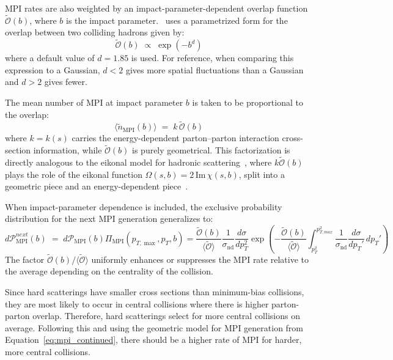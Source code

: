 MPI rates are also weighted by an impact-parameter-dependent overlap function $\tilde{\mathcal{O}}(b)$, where $b$ is the impact parameter. 
\pythia\ uses a parametrized form for the overlap between two colliding hadrons given by:
\begin{equation}
\tilde{\mathcal{O}}(b) \;\propto\; \exp\!\left(-b^d\right)
\end{equation}
where a default value of $d = 1.85$ is used. 
For reference, when comparing this expression to a Gaussian, $d < 2$ gives more spatial fluctuations than a Gaussian and $d > 2$ gives fewer. 

The mean number of MPI at impact parameter $b$ is taken to be proportional to the overlap:
\begin{equation}
\langle \tilde{n}_{\text{MPI}}(b) \rangle \;=\; k\,\tilde{\mathcal{O}}(b)
\end{equation}
where $k = k(s)$ carries the energy-dependent parton--parton interaction cross-section information, while $\tilde{\mathcal{O}}(b)$ is purely geometrical. 
This factorization is directly analogous to the eikonal model for hadronic scattering~\cite{glauber_lecture}, where $k\tilde{\mathcal{O}}(b)$ plays the role of the eikonal function $\Omega(s,b) = 2\,\text{Im}\,\chi(s,b)$, split into a geometric piece and an energy-dependent piece~\cite{pythia_evolution}. 

When impact-parameter dependence is included, the exclusive probability distribution for the next MPI generation generalizes to:
\begin{equation}
d\mathcal{P}_{\text{MPI}}^{next}(b) \;=\; d\mathcal{P}_{\text{MPI}}(b)\Pi_{\text{MPI}}(p_{T,\max}, p_T, b) = 
\frac{\tilde{\mathcal{O}}(b)}{\langle\tilde{\mathcal{O}}\rangle}
\frac{1}{\sigma_{\text{nd}}}\frac{d\sigma}{dp_{T}^2}
\exp\!\left(-\frac{\tilde{\mathcal{O}}(b)}{\langle\tilde{\mathcal{O}}\rangle}
\int_{p_{T}^2}^{p_{T,max}^2} \frac{1}{\sigma_{\text{nd}}} \frac{d\sigma}{dp_T'}\,dp_T'\right)
\label{eq:mpi_continued}
\end{equation}
The factor $\tilde{\mathcal{O}}(b)/\langle\tilde{\mathcal{O}}\rangle$ uniformly enhances or suppresses the MPI rate relative to the average depending on the centrality of the collision. 

Since hard scatterings have smaller cross sections than minimum-bias collisions, they are most likely to occur in central collisions where there is higher parton-parton overlap. 
Therefore, hard scatterings select for more central collisions on average.
Following this and using the geometric model for MPI generation from Equation~\eqref{eq:mpi_continued}, there should be a higher rate of MPI for harder, more central collisions.

